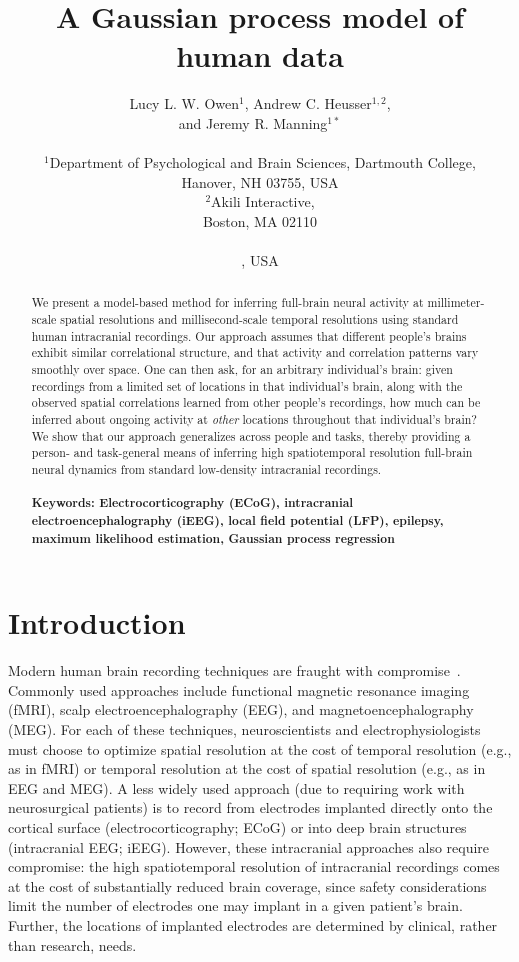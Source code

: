 \documentclass[11pt]{article}
\title{A Gaussian process model of human \DIFdelbegin \DIFdel{electrocorticographic }\DIFdelend \DIFaddbegin \DIFadd{e\-lect\-ro\-cort\-i\-co\-graph\-ic }\DIFaddend data}
\author{
  Lucy L. W. Owen$^{1}$,
  \DIFaddbegin \DIFadd{Tudor A. Muntianu$^{1}$,
  }\DIFaddend Andrew C. Heusser$^{1, 2}$, \DIFaddbegin \\
  \DIFadd{Patrick Daly$^{3}$,
  Katherine Scangos$^{3}$, }\DIFaddend and
  Jeremy R. Manning$^{1\ast}$\\\\
$^{1}$Department of Psychological and Brain Sciences, Dartmouth College,\\
Hanover, NH 03755, USA\\
$^{2}$Akili Interactive,\\
Boston, MA 02110\DIFaddbegin \DIFadd{, USA}\\
\DIFadd{$^{3}$Weill Institute for Neurosciences, University of California, San Francisco,}\\
\DIFadd{San Francisco, CA 94121}\DIFaddend , USA}
\date{}
\begin{document}
\baselineskip24pt
\maketitle

\begin{abstract}
  We present a model-based method for inferring full-brain neural
  activity at millimeter-scale spatial resolutions and
  millisecond-scale temporal resolutions using standard human
  intracranial recordings.  Our approach assumes that different
  people's brains exhibit similar correlational structure, and that
  activity and correlation patterns vary smoothly over space.  One can
  then ask, for an arbitrary individual's brain: given recordings from
  a limited set of locations in that individual's brain, along with
  the observed spatial correlations learned from other people's
  recordings, how much can be inferred about ongoing activity at
  \textit{other} locations throughout that
  individual's brain?  We show that our approach generalizes across
  people and tasks, thereby providing a person- and task-general means
  of inferring high spatiotemporal resolution full-brain neural
  dynamics from standard low-density intracranial recordings.
  \\\\
  \footnotesize{\textbf{Keywords: Electrocorticography (ECoG),
      intracranial electroencephalography (iEEG), local field
      potential (LFP), epilepsy, maximum likelihood estimation,
      Gaussian process regression}}
\end{abstract}

\section*{Introduction}
Modern human brain recording techniques are fraught with
compromise~\citep{SejnEtal14}.  Commonly used approaches include
functional magnetic resonance imaging (fMRI), scalp
electroencephalography (EEG), and magnetoencephalography (MEG).  For
each of these techniques, neuroscientists and electrophysiologists
must choose to optimize spatial resolution at the cost of temporal
resolution (e.g., as in fMRI) or temporal resolution at the cost of
spatial resolution (e.g., as in EEG and MEG).  A less widely used
approach (due to requiring work with neurosurgical patients) is to
record from electrodes implanted directly onto the cortical surface
(electrocorticography; ECoG) or into deep brain structures
(intracranial EEG; iEEG).  However, these intracranial approaches also
require compromise: the high spatiotemporal resolution of
intracranial recordings comes at the cost of substantially reduced
brain coverage, since safety considerations limit the number of
electrodes one may implant in a given patient's brain.  Further, the
locations of implanted electrodes are determined by clinical, rather
than research, needs.
\end{document}
